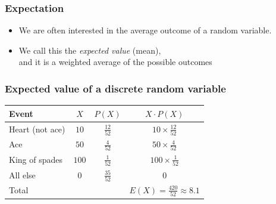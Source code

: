 \documentclass[notes,11pt, aspectratio=169]{beamer}
\begin{document}
\begin{frame}
\frametitle{Expectation}

\begin{itemize}

\item We are often interested in the average outcome of a random variable.

\item We call this the \textcolor{hlblue}{\textit{expected value}} (mean), \\
and it is a weighted average of the possible outcomes
\formula{
\begin{tcolorbox}[colback = textboxgreen!75]
\color{denim}
\[\mu = E(X) = \sum_{i = 1}^k x_i ~ P(X = x_i)\]
\end{tcolorbox}}

\end{itemize}

\end{frame}


\begin{frame}
\frametitle{Expected value of a discrete random variable}


\pause

\begin{center}
\renewcommand{\arraystretch}{1.5}
\begin{tabular}{l | c | c | c }
Event		& $X$ 		& $P(X)$        		& $X \cdot P(X)$ \\
\hline
Heart (not ace)	& $10$		& $\frac{12}{52}$	& $10\times\frac{12}{52}$ \\
Ace			& $50$		& $\frac{4}{52}$	& $50\times\frac{4}{52}$ \\	
King of spades	& $100$		& $\frac{1}{52}$	& $100\times\frac{1}{52}$ \\	
All else		& $0$		& $\frac{35}{52}$	& $0$ \\
\hline
Total			&			&				& $E(X) = \frac{420}{52} \approx 8.1$
\end{tabular}

\end{center}

\end{frame}
\end{document}
